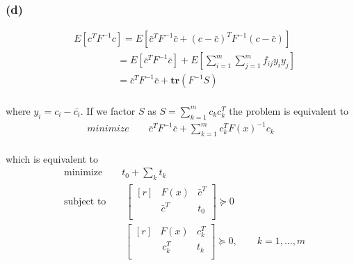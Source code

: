 \subsubsection*{(d)}
\begin{align*}
&E[c^TF^{-1}c] = E[\bar{c}^TF^{-1}\bar{c} + (c-\bar{c})^TF^{-1} (c-\bar{c})] \\
&\qquad \qquad \ \ =E[\bar{c}^TF^{-1}\bar{c}] + E[\sum_{i =1}^{m}\sum_{j =1}^{m}f_{ij}y_iy_j] \\
&\qquad \qquad \ \ =\bar{c}^TF^{-1}\bar{c} + \textbf{tr}(F^{-1}S)
\end{align*}
\paragraph{}
where $y_i = c_i -\bar{c_i}$. If we factor $S$ as $S = \sum_{k =1 }^{m} c_kc_k^T$ the problem is equivalent to 
\begin{align*}
minimize \qquad \bar{c}^TF^{-1}\bar{c} + \sum_{k =1 }^{m} c_k^TF(x)^{-1}c_k
\end{align*}
\paragraph{}
which is equivalent to 
\begin{align*}
&\text{minimize} \qquad t_0 +\sum_kt_k \\
&\text{subject to} \qquad \begin{bmatrix*}[r]
&F(x) & \bar{c}^T \\ & \bar{c}^T & t_0\\
\end{bmatrix*} \succeq 0 \\
&\qquad \qquad \qquad \ \begin{bmatrix*}[r]
&F(x) & c_k^T \\ & \ c_k^T & t_k\\
\end{bmatrix*} \succeq 0, \qquad k = 1,...,m
\end{align*}